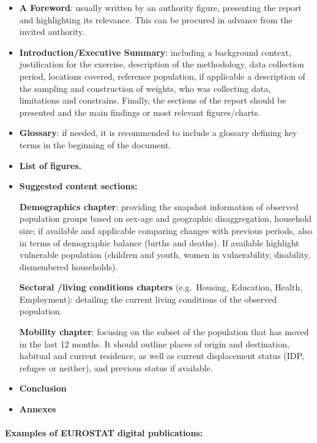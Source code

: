 \documentclass[
]{article}
\begin{document}
\begin{itemize}
\item
  \textbf{A Foreword}: usually written by an authority figure, presenting
  the report and highlighting its relevance. This can be procured in
  advance from the invited authority.
\item
  \textbf{Introduction/Executive Summary}: including a background context,
  justification for the exercise, description of the methodology, data
  collection period, locations covered, reference population, if
  applicable a description of the sampling and construction of
  weights, who was collecting data, limitations and constrains.
  Finally, the sections of the report should be presented and the main
  findings or most relevant figures/charts.
\item
  \textbf{Glossary}: if needed, it is recommended to include a glossary
  defining key terms in the beginning of the document.
\item
  \textbf{List of figures.}
\item
  \textbf{Suggested content sections:}

  \textbf{Demographics chapter}: providing the snapshot information of
  observed population groups based on sex-age and geographic
  disaggregation, household size; if available and applicable
  comparing changes with previous periods, also in terms of
  demographic balance (births and deaths). If available highlight
  vulnerable population (children and youth, women in vulnerability,
  disability, dismembered households).

  \textbf{Sectoral /living conditions chapters} (e.g.~Housing, Education,
  Health, Employment): detailing the current living conditions of the
  observed population.

  \textbf{Mobility chapter}: focusing on the subset of the population that
  has moved in the last 12 months. It should outline places of origin
  and destination, habitual and current residence, as well as current
  displacement status (IDP, refugee or neither), and previous status
  if available.
\end{itemize}

\begin{itemize}
\item
  \textbf{Conclusion}
\item
  \textbf{Annexes}
\end{itemize}

\hypertarget{examples-of-eurostat-digital-publications-1}{%
\paragraph{Examples of EUROSTAT digital publications:}\label{examples-of-eurostat-digital-publications-1}}
\end{document}
